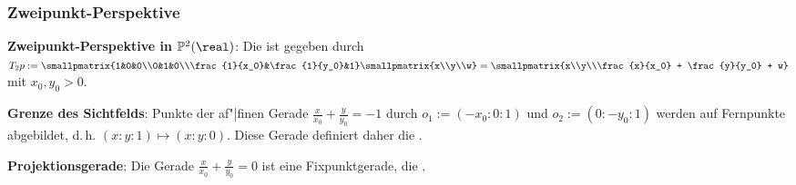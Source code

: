 \subsubsection{%
    Zweipunkt-Perspektive%
}

\textbf{Zweipunkt-Perspektive in $\PP^2(\real)$}:
Die  ist gegeben durch
$T_2 p := \smallpmatrix{1&0&0\\0&1&0\\\frac{1}{x_0}&\frac{1}{y_0}&1} \smallpmatrix{x\\y\\w}
= \smallpmatrix{x\\y\\\frac{x}{x_0} + \frac{y}{y_0} + w}$ mit $x_0, y_0 > 0$.

\vspace{2mm}
\linie

\textbf{Grenze des Sichtfelds}:
Punkte der af"|finen Gerade $\frac{x}{x_0} + \frac{y}{y_0} = -1$ durch $o_1 := (-x_0:0:1)$ und
$o_2 := (0:-y_0:1)$ werden auf Fernpunkte abgebildet, d.\,h. $(x:y:1) \mapsto (x:y:0)$.
Diese Gerade definiert daher die .

\textbf{Projektionsgerade}:
Die Gerade $\frac{x}{x_0} + \frac{y}{y_0} = 0$ ist eine Fixpunktgerade, die
.



